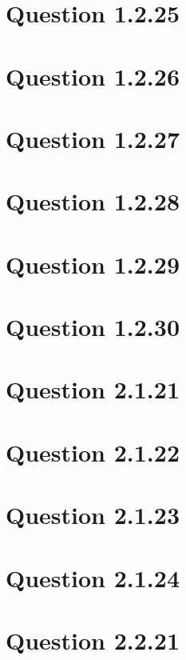 \documentclass[journal,12pt,twocolumn]{IEEEtran}
\begin{document}
\section{\textbf{Question 1.2.25}}

\section{\textbf{Question 1.2.26}}

\section{\textbf{Question 1.2.27}}

\section{\textbf{Question 1.2.28}}

\section{\textbf{Question 1.2.29}}

\section{\textbf{Question 1.2.30}}



\section{\textbf{Question 2.1.21}}

\section{\textbf{Question 2.1.22}}

\section{\textbf{Question 2.1.23}}

\section{\textbf{Question 2.1.24}}


\section{\textbf{Question 2.2.21}}

\end{document}
